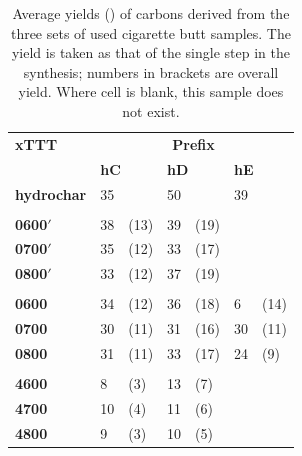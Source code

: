 \begin{table}[b!]
    \caption{Average yields (\unit{\wtpercent}) of carbons derived from the three sets of used cigarette butt samples. The yield is taken as that of the single step in the synthesis; numbers in brackets are overall yield. Where cell is blank, this sample does not exist.}
    \label{tb:cb_yield}
    \begin{tabularx}{\textwidth}{llXlXlX}
        \toprule
            \textbf{xTTT} & \multicolumn{6}{c}{\textbf{Prefix}} \\
            & \multicolumn{2}{l}{\textbf{hC}} & \multicolumn{2}{l}{\textbf{hD}} & \multicolumn{2}{l}{\textbf{hE}} \\ 
        \midrule
            \textbf{hydrochar}  & 35 & & 50 & & 39 & \\
        \\
            \textbf{0600$'$} & 38 & (13) & 39 & (19) & & \\
            \textbf{0700$'$} & 35 & (12) & 33 & (17) & & \\
            \textbf{0800$'$} & 33 & (12) & 37 & (19) & & \\
        \\
            \textbf{0600} & 34 & (12) & 36 & (18) & 6 & (14) \\
            \textbf{0700} & 30 & (11) & 31 & (16) & 30 & (11)\\
            \textbf{0800} & 31 & (11) & 33 & (17) & 24 & (9)\\
        \\
            \textbf{4600} & 8 & (3) & 13 & (7) & & \\
            \textbf{4700} & 10 & (4) & 11 & (6) & & \\
            \textbf{4800} & 9 & (3) & 10 & (5) & & \\
        \bottomrule
    \end{tabularx}%
\end{table}


